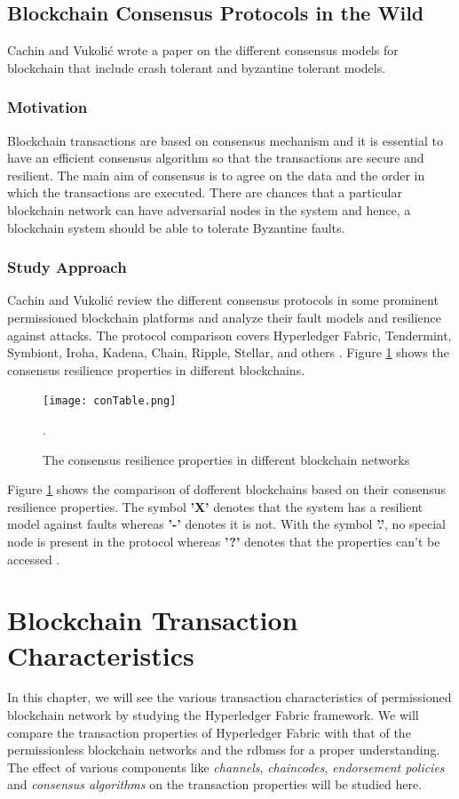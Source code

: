 \documentclass[
  a4paper,  %
  twoside,  %
  bibliography=totoc,
  headsepline,
  cleardoublepage=empty,
  parskip=half,
  draft=false
]{scrbook}
\begin{document}
\section{Blockchain Consensus Protocols in the Wild}
\label{sec:3}
Cachin and Vukoli\'c \cite{Con} wrote a paper on the different consensus models for blockchain that include crash tolerant and byzantine tolerant models.

\subsection{Motivation}
Blockchain transactions are based on consensus mechanism and it is essential to have an efficient consensus algorithm so that the transactions are secure and resilient. The main aim of consensus is to agree on the data and the order in which the transactions are executed. There are chances that a particular blockchain network can have adversarial nodes in the system and hence, a blockchain system should be able to tolerate Byzantine faults. 

\subsection{Study Approach}
Cachin and Vukoli\'c review the different consensus protocols in some prominent permissioned blockchain platforms and analyze their fault models and resilience against attacks. The protocol comparison covers Hyperledger Fabric, Tendermint, Symbiont, Iroha, Kadena, Chain,  Ripple, Stellar, and others \cite{Con}. Figure \ref{fig:conT} shows the consensus resilience properties in different blockchains.

\begin{figure}[h!]
\begin{center}
\texttt{[image: conTable.png]}
\caption{The consensus resilience properties in different blockchain networks \cite{Con}}.
\label{fig:conT}
\end{center}
\end{figure}

Figure \ref{fig:conT} shows the comparison of dofferent blockchains based on their consensus resilience properties. The symbol \textbf{'X'} denotes that the system has a resilient model against faults whereas \textbf{'-'} denotes it is not. With the symbol \textbf{'.'}, no special node is present in the protocol whereas \textbf{'?'} denotes that the properties can't be accessed \cite{Con}.

\chapter{Blockchain Transaction Characteristics}
In this chapter, we will see the various transaction characteristics of permissioned blockchain network by studying the Hyperledger Fabric framework. We will compare the transaction properties of Hyperledger Fabric with that of the permissionless blockchain networks and the \glspl{rdbms} for a proper understanding. The effect of various components like \textit{channels}, \textit{chaincodes}, \textit{endorsement policies} and \textit{consensus algorithms} on the transaction properties will be studied here.
\label{chap:tc}
\end{document}
